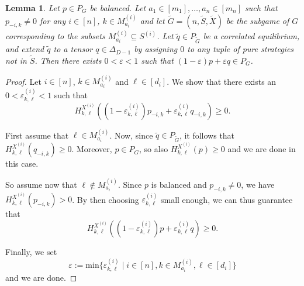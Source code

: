 \documentclass[11pt]{amsart}
\newtheorem{lemma}[theorem]{Lemma}
\theoremstyle{definition}
\numberwithin{subcase}{case}
\renewcommand{\tilde}[1]{\widetilde{#1}}
\begin{document}
\begin{lemma}
\label{LemmaSubgameAdd}
Let $p \in P_G$ be balanced. Let $a_1 \in [m_1], \dots, a_n \in [m_n]$ such that $p_{-i,k} \neq 0$ for any $i \in [n]$, $k \in M^{(i)}_{a_i}$ and
let $\tilde{G}=(n,\tilde{S},\tilde{X})$ be the subgame of $G$
corresponding to the subsets $M_{a_i}^{(i)} \subseteq S^{(i)}$. Let
$\tilde{q} \in P_{\tilde{G}}$ be a correlated equilibrium, and extend
$\tilde{q}$ to a tensor $q \in \Delta_{D-1}$ by assigning $0$ to any
tuple of pure strategies not in $\tilde{S}$. Then there exists $0<\varepsilon<1$
such that $(1-\varepsilon)p + \varepsilon q \in P_G$.
\end{lemma}
\begin{proof}
Let $i \in [n]$, $k \in M_{a_i}^{(i)}$ and $\ell \in [d_i]$. We show that there exists an $0<\varepsilon^{(i)}_{k,\ell} <1$ such that \[
    H^{X^{(i)}}_{k,\ell} \left(
    (1-\varepsilon^{(i)}_{k,\ell})p_{-i,k} +
    \varepsilon^{(i)}_{k,\ell} q_{-i,k}  \right) \geq 0. 
\]

\noindent First assume that $\ell \in M_{a_i}^{(i)}$. Now, since $\tilde{q} \in
P_{\tilde{G}}$, it follows that $H^{X^{(i)}}_{k,\ell}(q_{-i,k}) \geq 0$. Moreover, $p \in P_G$, so also $H^{X^{(i)}}_{k,\ell}(p) \geq 0$ and we are done in this case.

So assume now that $\ell \not\in M_{a_i}^{(i)}$. Since $p$ is balanced
and $p_{-i,k} \neq 0$, we have $H^{X^{(i)}}_{k,\ell}(p_{-i,k}) > 0$. By then choosing $\varepsilon^{(i)}_{k,\ell}$ small enough, we can thus guarantee that  \[ H^{X^{(i)}}_{k,\ell} \left( (1-\varepsilon^{(i)}_{k,\ell})p + \varepsilon^{(i)}_{k,\ell} q  \right) \geq 0. \]

\noindent Finally, we set \[ \varepsilon:= \mathrm{min} \{ \varepsilon^{(i)}_{k,\ell} \mid i \in [n], k \in M_{a_i}^{(i)}, \ell \in [d_i]   \}\] and we are done.
\end{proof}
\end{document}
